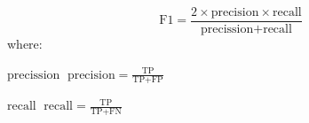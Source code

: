 \begin{equation}
\label{eq:f1}
\text{F1} = \frac{2 \times \text{precision} \times \text{recall} }{\text{precission} + \text{recall}}
\end{equation}
where: 
\begin{eqexpl}[25mm]
	\item{$\text{precission}$} $\; \text{precision} = \frac{\text{TP}}{\text{TP} + \text{FP}} \;$
	\item{$\text{recall}$} $\; \text{recall} = \frac{\text{TP}}{\text{TP} + \text{FN}} \;$ 
\end{eqexpl}

